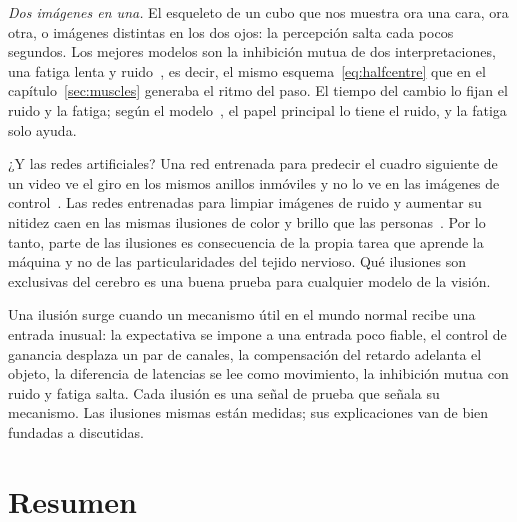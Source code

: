 \emph{Dos imágenes en una.} El esqueleto de un cubo que nos muestra ora una cara, ora otra, o imágenes distintas en los dos ojos: la percepción salta cada pocos segundos. Los mejores modelos son la inhibición mutua de dos interpretaciones, una fatiga lenta y ruido~\cite{MorenoBote2007}, es decir, el mismo esquema~\eqref{eq:halfcentre} que en el capítulo~\ref{sec:muscles} generaba el ritmo del paso. El tiempo del cambio lo fijan el ruido y la fatiga; según el modelo~\cite{MorenoBote2007}, el papel principal lo tiene el ruido, y la fatiga solo ayuda.

¿Y las redes artificiales? Una red entrenada para predecir el cuadro siguiente de un video ve el giro en los mismos anillos inmóviles y no lo ve en las imágenes de control~\cite{Watanabe2018}. Las redes entrenadas para limpiar imágenes de ruido y aumentar su nitidez caen en las mismas ilusiones de color y brillo que las personas~\cite{GomezVilla2020}. Por lo tanto, parte de las ilusiones es consecuencia de la propia tarea que aprende la máquina y no de las particularidades del tejido nervioso. Qué ilusiones son exclusivas del cerebro es una buena prueba para cualquier modelo de la visión.

\begin{keyblock}
\begin{proposition}
\label{prop:illusions}
Una ilusión surge cuando un mecanismo útil en el mundo normal recibe una entrada inusual: la expectativa se impone a una entrada poco fiable, el control de ganancia desplaza un par de canales, la compensación del retardo adelanta el objeto, la diferencia de latencias se lee como movimiento, la inhibición mutua con ruido y fatiga salta. Cada ilusión es una señal de prueba que señala su mecanismo. Las ilusiones mismas están medidas; sus explicaciones van de bien fundadas a discutidas.
\end{proposition}
\end{keyblock}

\section{Resumen}

